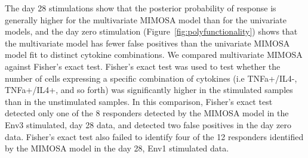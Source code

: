 \documentclass[11pt]{article}
\begin{document}
The day 28 stimulations show that the posterior probability of response is generally higher for the multivariate MIMOSA model than for the univariate models, and the day zero stimulation (Figure~\ref{fig:polyfunctionality}) shows that the multivariate model has fewer false positives than the univariate MIMOSA model fit to distinct cytokine combinations. We compared multivariate MIMOSA against Fisher's exact test. Fisher's exact test was used to test whether the number of cells expressing a specific combination of cytokines (i.e TNFa+/IL4-, TNFa+/IL4+, and so forth) was significantly higher in the stimulated samples than in the unstimulated samples.  In this comparison, Fisher's exact test detected only one of the 8 responders detected by the MIMOSA model in the Env3 stimulated, day 28 data, and detected two false positives in the day zero data. Fisher's exact test also failed to identify four of the 12 responders identified by the MIMOSA model in the day 28, Env1 stimulated data.


\end{document}
